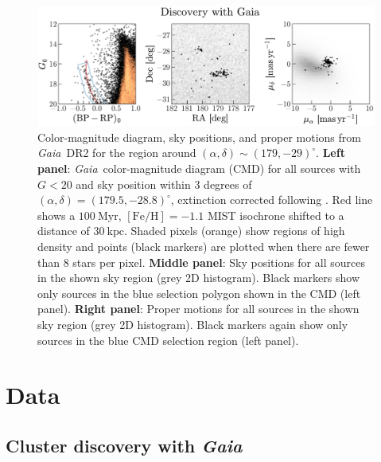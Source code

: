 \documentclass[twocolumn]{aastex62}
\newcommand{\acronym}[1]{{\small{#1}}}
\newcommand{\gaia}{\textsl{Gaia}}
\newcommand{\DR}[1]{\acronym{DR#1}}
\newcommand{\kpc}{\textrm{kpc}}
\newcommand{\feh}{\ensuremath{[\textrm{Fe} / \textrm{H}]}}
\begin{document}
\begin{figure}[t!]
\centering
\includegraphics[width=\textwidth]{figures/gaia-cmd-pm.pdf}
\caption{Color-magnitude diagram, sky positions, and proper motions from \gaia\ \DR{2} for the region around $(\alpha, \delta) \sim (179, -29)^\circ$.
\textbf{Left panel}: \gaia\ color-magnitude diagram (CMD) for all sources with $G < 20$ and sky position within 3 degrees of $(\alpha, \delta) = (179.5, -28.8)^\circ$, extinction corrected following \citet{Danielski:2018}.
Red line shows a $100~\textrm{Myr}$, $\feh = -1.1$ \acronym{MIST} isochrone shifted to a distance of $30~\kpc$.
Shaded pixels (orange) show regions of high density and points (black markers) are plotted when there are fewer than 8 stars per pixel.
\textbf{Middle panel}: Sky positions for all sources in the shown sky region (grey 2D histogram).
Black markers show only sources in the blue selection polygon shown in the CMD (left panel).
\textbf{Right panel}: Proper motions for all sources in the shown sky region (grey 2D histogram).
Black markers again show only sources in the blue CMD selection region (left panel).
}
\label{fig:cmds}
\end{figure}

\section{Data} \label{sec:data}

\subsection{Cluster discovery with \gaia}
\label{sec:discovery}
\end{document}
